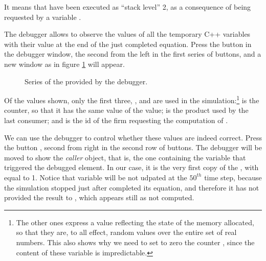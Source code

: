 \documentclass [11pt,a4paper] {book}
\begin{document}
It means that  have been executed as ``stack level'' 2, as a consequence of being requested by a variable . 

The debugger allows to observe the values of all the temporary C++ variables  with their value at the end of the just completed equation. Press the button  in the debugger window, the second from the left in the first series of buttons, and a new window as in figure \ref{fig:v} will appear.


\begin{figure}[ht]
  \centering
  \caption{\small Series of the  provided by the debugger.}
   \label{fig:v}
\end{figure}

Of the values shown, only the first three, ,  and  are used in the simulation:\footnote{The other ones express a value reflecting the state of the memory allocated, so that they are, to all effect, random values over the entire set of real numbers. This also shows why we need to set to zero the counter , since the content of these variable is impredictable.}  is the counter, so that it has the same value of the  value;  is the product used by the last consumer; and  is the id of the firm requesting the computation of .

We can use the debugger to control whether these values are indeed correct. Press the button , second from right in the second row of buttons. The debugger will be moved to show the \textit{caller} object, that is, the one containing the variable that triggered the debugged element. In our case, it is the very first copy of the , with  equal to 1. Notice that variable  will be not udpated at the $50^{th}$ time step, because the simulation stopped just after  completed its equation, and therefore it has not provided the result to , which appears still as not computed.
\end{document}
